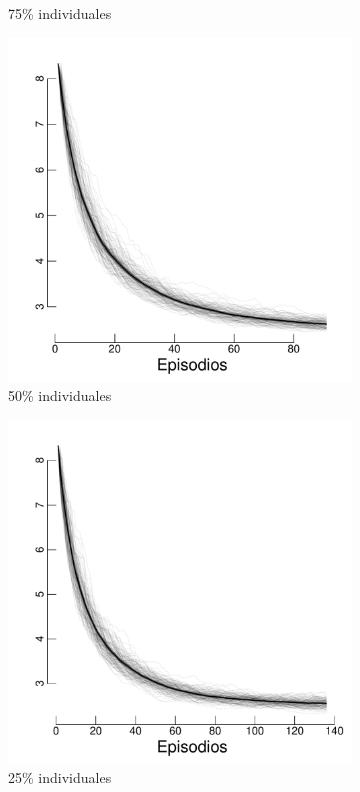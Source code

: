 \documentclass[a4paper,11pt]{book}
\theoremstyle{definition}
\begin{document}
\begin{figure}[H]
\begin{subfigure}[t]{0.32\textwidth}
  \caption{\scriptsize 75\% individuales}\label{H4_lambda}
  \end{subfigure}
  \begin{subfigure}[t]{0.32\textwidth}
  \includegraphics[page=2,width=\textwidth]{static/truesynergy/expH1.pdf}
  \caption{\scriptsize 50\% individuales}\label{H1_lambda}
  \end{subfigure}
  \begin{subfigure}[t]{0.32\textwidth}
  \includegraphics[page=2,width=\textwidth]{static/truesynergy/expH3.pdf}
  \caption{\scriptsize 25\% individuales}\label{H3_lambda}
  \end{subfigure}
  \caption{}
  \label{fig:sinergia}
\end{figure}
\end{document}
